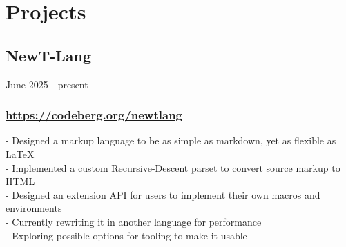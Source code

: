 
\section{Projects}


\subsection{NewT-Lang} June 2025 - present \\
\subsubsection{\href{https://github.com/newtlang}{https://codeberg.org/newtlang}}
-\:  Designed a markup language to be as simple as markdown, yet as flexible as \LaTeX \\
-\:  Implemented a custom Recursive-Descent parset to convert source markup to HTML \\
-\:  Designed an extension API for users to implement their own macros and environments \\
-\:  Currently rewriting it in another language for performance \\
-\:  Exploring possible options for tooling to make it usable \\


